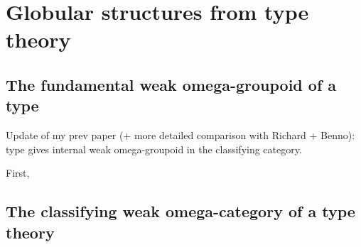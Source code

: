 
\chapter{Globular structures from type theory}


\section{The fundamental weak omega-groupoid of a type}

Update of my prev paper (+ more detailed comparison with Richard + Benno): type gives internal weak omega-groupoid in the classifying category.

First, 

\section{The classifying weak omega-category of a type theory}




